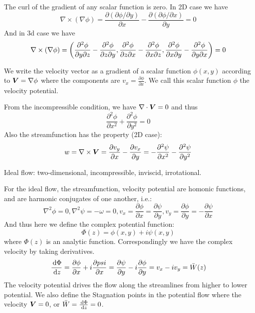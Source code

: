 \documentclass{article}
\begin{document}
\begin{remark}
    The curl of the gradient of any scalar function is zero. In 2D case we have
    \[\nabla\times (\nabla \phi) = \frac{\partial (\partial \phi/\partial y)}{\partial x} - \frac{\partial(\partial \phi/\partial x)}{\partial y}=0\]
    And in 3d case we have
    \[\nabla\times (\nabla \phi) = \left( \frac{\partial ^2\phi}{\partial y\partial z}-\frac{\partial ^2\phi}{\partial z\partial y},\frac{\partial ^2\phi}{\partial z\partial x}-\frac{\partial ^2\phi}{\partial x\partial z},\frac{\partial ^2\phi}{\partial x\partial y}-\frac{\partial ^2\phi}{\partial y\partial x} \right) =0\]
\end{remark}

\begin{definition}
    We write the velocity vector as a gradient of a scalar function \(\phi(x,y)\) according to \(\boldsymbol{V} = \nabla \phi\) where the components are \( v_x = \frac{\partial\phi}{\partial x}\). We call this scalar function \(\phi\) the velocity potential.
\end{definition}

\begin{corollary}
    From the incompressible condition, we have \(\nabla\cdot\boldsymbol{V} = 0\) and thus
    \[\frac{\partial^2 \phi}{\partial x^2}+\frac{\partial^2\phi}{\partial y^2} = 0\]
    Also the streamfunction has the property (2D case):
    \[w=\nabla\times \boldsymbol{V} = \frac{\partial v_y}{\partial x}-\frac{\partial v_x}{\partial y} = -\frac{\partial^2\psi}{\partial x^2}- \frac{\partial^2\psi}{\partial y^2}\]
\end{corollary}

\begin{definition}
    Ideal flow: two-dimensional, incompressible, inviscid, irrotational.
\end{definition}

\begin{corollary}
    For the ideal flow, the streamfunction, velocity potential are homonic functions, and are harmonic conjugates of one another, i.e.:
    \[\nabla^2 \phi = 0, \nabla^2\psi = -\omega=0, v_x = \frac{\partial \phi}{\partial x}=\frac{\partial \psi}{\partial y}, v_y = \frac{\partial \phi}{\partial y}=-\frac{\partial \psi}{\partial x}\]
    And thus here we define the complex potential function:
    \[\Phi(z) = \phi(x,y)+i\psi(x,y)\]
    where \(\Phi(z)\) is an analytic function. Correspondingly we have the complex velocity by taking derivatives.
    \[\frac{\,\mathrm{d}\Phi}{\,\mathrm{d} z} = \frac{\partial \phi}{\partial x}+i\frac{\partial psi}{\partial x} = \frac{\partial \psi}{\partial y}-i\frac{\partial \phi}{\partial y} = v_x-iv_y = \bar W(z)\]
    The velocity potential drives the flow along the streamlines from higher to lower potential.
    We also define the Stagnation points in the potential flow where the velocity \(\boldsymbol{V} = 0\), or \(\bar W = \frac{\,\mathrm{d} \Phi}{\,\mathrm{d} z} = 0\).
\end{corollary}
\end{document}
